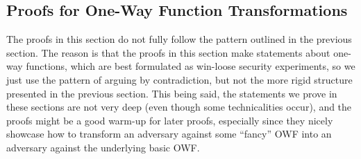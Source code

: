 \subsection{Proofs for One-Way Function Transformations}
The proofs in this section do not fully follow the pattern outlined in the previous section. The reason is that the proofs in this section make statements about one-way functions, which are best formulated as win-loose security experiments, so we just use the pattern of arguing by contradiction, but not the more rigid structure presented in the previous section. This being said, the statements we prove in these sections are not very deep (even though some technicalities occur), and the proofs might be a good warm-up for later proofs, especially since they nicely showcase how to transform an adversary against some ``fancy'' OWF into an adversary against the underlying basic OWF.

